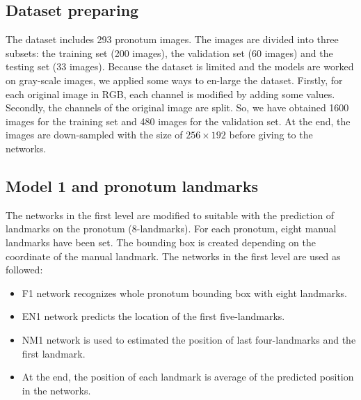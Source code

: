 \documentclass[12pt,a4paper]{article}
\begin{document}
\subsection{Dataset preparing}
The dataset includes 293 pronotum images. The images are divided into three subsets: the training set (200 images), the validation set (60 images) and the testing set (33 images). Because the dataset is limited and the models are worked on gray-scale images, we applied some ways to en-large the dataset. Firstly, for each original image in RGB, each channel is modified by adding some values. Secondly, the channels of the original image are split. So, we have obtained 1600 images for the training set and 480 images for the validation set. At the end, the images are down-sampled with the  size of $256 \times 192$ before giving to the networks.

\subsection{Model 1 and pronotum landmarks}
The networks in the first level are modified to suitable with the prediction of landmarks on the pronotum (8-landmarks). For each pronotum, eight manual landmarks have been set. The bounding box is created depending on the coordinate of the manual landmark. The networks in the first level are used as followed:
\begin{itemize}
	\item F1 network recognizes whole pronotum bounding box with eight landmarks.
	\item EN1 network predicts the location of the first five-landmarks.
	\item NM1 network is used to estimated the position of last four-landmarks and the first landmark.
	\item At the end, the position of each landmark is average of the predicted position in the networks.
\end{itemize} 
\end{document}
